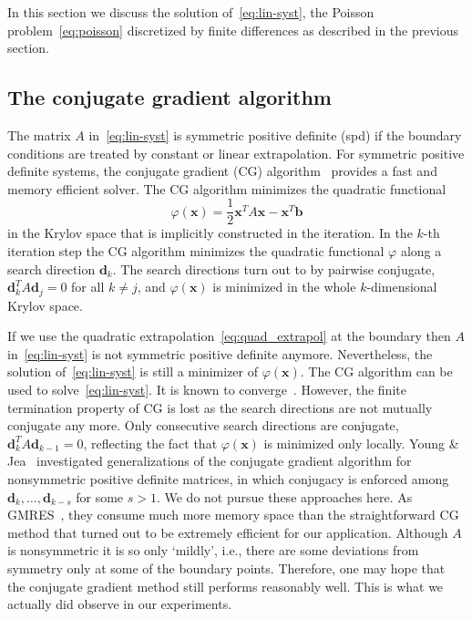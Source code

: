 \documentclass[a4paper,10pt,3p,preprint,pdftex]{elsarticle}
\begin{document}
In this section we discuss the solution of~\eqref{eq:lin-syst}, the
Poisson problem~\eqref{eq:poisson} discretized by finite differences as
described in the previous section.

\subsection{The conjugate gradient algorithm}

The matrix $A$ in~\eqref{eq:lin-syst} is symmetric positive definite
(spd) if the boundary conditions are treated by constant or linear
extrapolation.  For symmetric positive definite systems, the conjugate
gradient (CG) algorithm~\cite{hack:94,hest:52} provides a fast and
memory efficient solver.  The CG algorithm minimizes the quadratic
functional
\begin{equation} \label{eq:cg-funct}
  \varphi(\mathbf{x}) = \frac{1}{2}\mathbf{x}^T A \mathbf{x} - \mathbf{x}^T
  \mathbf{b}
\end{equation}
in the Krylov space that is implicitly constructed in the iteration.  In
the $k$-th iteration step the CG algorithm minimizes the quadratic
functional $\varphi$ along a search direction $\mathbf{d}_k$.  The search
directions turn out to by pairwise conjugate, $\mathbf{d}_k^T A
\mathbf{d}_j = 0$ for all $k\neq j$, and $\varphi(\mathbf{x})$ is
minimized in the whole $k$-dimensional Krylov space.

If we use the quadratic extrapolation~\eqref{eq:quad_extrapol} at the
boundary then $A$ in~\eqref{eq:lin-syst} is not symmetric positive
definite anymore.  Nevertheless, the solution of~\eqref{eq:lin-syst} is
still a minimizer of $\varphi(\mathbf{x})$.  The CG algorithm can be
used to solve~\eqref{eq:lin-syst}.  It is known to
converge~\cite{gree:97}.  However, the finite termination property of CG
is lost as the search directions are not mutually conjugate any more.
Only consecutive search directions are conjugate, $\mathbf{d}_k^T A
\mathbf{d}_{k-1} = 0$, reflecting the fact that $\varphi(\mathbf{x})$ is
minimized only locally.
Young \& Jea~\cite{yoje:80} investigated generalizations of the
conjugate gradient algorithm for nonsymmetric positive definite
matrices, in which conjugacy is enforced among $\mathbf{d}_k, \ldots,
\mathbf{d}_{k-s}$ for some $s>1$.  We do not pursue these approaches
here.  As GMRES~\cite{sasc:86}, they consume much more memory space than
the straightforward CG method that turned out to be extremely efficient
for our application.  Although $A$ is nonsymmetric it is so only
`mildly', i.e., there are some deviations from symmetry only at some of
the boundary points.  Therefore, one may hope that the conjugate
gradient method still performs reasonably well.  This is what we
actually did observe in our experiments.
\end{document}
